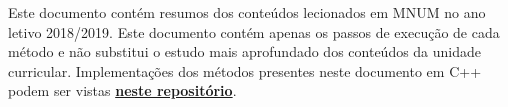 \documentclass[../resumosMNUM.tex]{subfiles}
\begin{document}
 

Este documento contém resumos dos conteúdos lecionados em MNUM no ano letivo 2018/2019. Este documento contém apenas os passos de execução de cada método e não substitui o estudo mais aprofundado dos conteúdos da unidade curricular. Implementações dos métodos presentes neste documento em C++ podem ser vistas \textbf{\href{https://github.com/pemesteves/MNUM_1819}{neste repositório}}.
\end{document}
